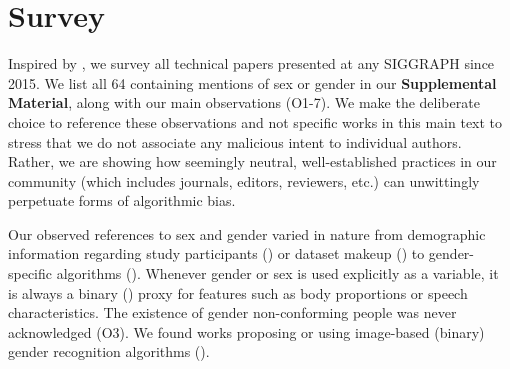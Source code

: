\documentclass[sigconf,balance=false]{acmart}
\begin{document}
\vspace{-0.1cm}
\section{Survey}


Inspired by \citet{keyes2018misgendering}, we survey
all technical papers presented at any SIGGRAPH since 2015. We list all 64 containing mentions of sex or gender in our \textbf{Supplemental Material}, along with our main observations (O1-7). We make the deliberate choice to reference these observations and not specific works in this main text to stress that we do not associate any malicious intent to individual authors. Rather, we are showing how seemingly neutral, well-established practices in our community (which includes journals, editors, reviewers, etc.) can unwittingly perpetuate forms of algorithmic bias.

Our observed references to sex and gender varied in nature from demographic information regarding study participants (\userstudy) or dataset makeup (\dataset) to gender-specific algorithms (\var). Whenever gender or sex is used
explicitly as a variable, it is always a binary (\binary) proxy for features such as body proportions or speech characteristics. The existence of gender non-conforming people was never acknowledged (O3). We found works proposing or using image-based (binary) gender recognition algorithms (\classifier).


\vspace{-0.1cm}
\end{document}
